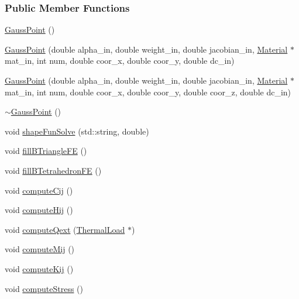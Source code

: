 \subsubsection*{Public Member Functions}
\begin{DoxyCompactItemize}
\item 
\hyperlink{classmknix_1_1_gauss_point_a1d7606bf5762dabe86b0c5c83f2f1de2}{Gauss\-Point} ()
\item 
\hyperlink{classmknix_1_1_gauss_point_a41f2a35d335cd9e2c9880beca96b3a29}{Gauss\-Point} (double alpha\-\_\-in, double weight\-\_\-in, double jacobian\-\_\-in, \hyperlink{classmknix_1_1_material}{Material} $\ast$mat\-\_\-in, int num, double coor\-\_\-x, double coor\-\_\-y, double dc\-\_\-in)
\item 
\hyperlink{classmknix_1_1_gauss_point_a6545ce23d852884b899d81a9c79691bd}{Gauss\-Point} (double alpha\-\_\-in, double weight\-\_\-in, double jacobian\-\_\-in, \hyperlink{classmknix_1_1_material}{Material} $\ast$mat\-\_\-in, int num, double coor\-\_\-x, double coor\-\_\-y, double coor\-\_\-z, double dc\-\_\-in)
\item 
\hyperlink{classmknix_1_1_gauss_point_a84a09a5e3fa0bf13b6c1d710a838f883}{$\sim$\-Gauss\-Point} ()
\item 
void \hyperlink{classmknix_1_1_gauss_point_a57e21322f3c898490257853fb2777077}{shape\-Fun\-Solve} (std\-::string, double)
\item 
void \hyperlink{classmknix_1_1_gauss_point_a2c7657d7897b22f27427c612b67a2956}{fill\-B\-Triangle\-F\-E} ()
\item 
void \hyperlink{classmknix_1_1_gauss_point_a0ea2abbe3c96295050f7cae7601a0713}{fill\-B\-Tetrahedron\-F\-E} ()
\item 
void \hyperlink{classmknix_1_1_gauss_point_ab82f09f4b4f9ae25f78551e1aa2e4ee6}{compute\-Cij} ()
\item 
void \hyperlink{classmknix_1_1_gauss_point_a92a5358c2a4305b15d33d265e4603621}{compute\-Hij} ()
\item 
void \hyperlink{classmknix_1_1_gauss_point_abb5b248896056fd76d2e4ec8280a17f5}{compute\-Qext} (\hyperlink{classmknix_1_1_thermal_load}{Thermal\-Load} $\ast$)
\item 
void \hyperlink{classmknix_1_1_gauss_point_a9a01f1ad9df5669317e8aa41ab8be649}{compute\-Mij} ()
\item 
void \hyperlink{classmknix_1_1_gauss_point_aec3728abc07b0daa885b5a663916c95e}{compute\-Kij} ()
\item 
void \hyperlink{classmknix_1_1_gauss_point_a4ed005e06a27c61eaf650dc841caf897}{compute\-Stress} ()

\end{DoxyCompactItemize}

